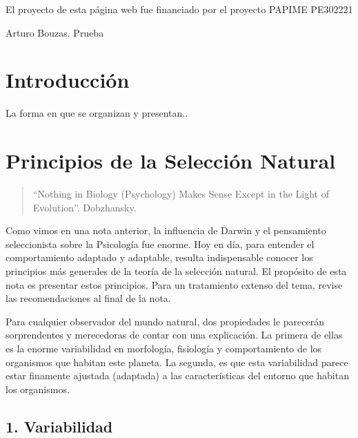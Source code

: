 \documentclass[
  letterpaper,
]{book}
\begin{document}
El proyecto de esta página web fue financiado por el proyecto PAPIME
PE302221

Arturo Bouzas. Prueba


\chapter*{Introducción}\label{introducciuxf3n}


La forma en que se organizan y presentan..


\chapter{Principios de la Selección
Natural}\label{principios-de-la-selecciuxf3n-natural}

\begin{quote}
``Nothing in Biology (Psychology) Makes Sense Except in the Light of
Evolution''. Dobzhansky.
\end{quote}

Como vimos en una nota anterior, la influencia de Darwin y el
pensamiento seleccionista sobre la Psicología fue enorme. Hoy en día,
para entender el comportamiento adaptado y adaptable, resulta
indispensable conocer los principios más generales de la teoría de la
selección natural. El propósito de esta nota es presentar estos
principios. Para un tratamiento extenso del tema, revise las
recomendaciones al final de la nota.

Para cualquier observador del mundo natural, dos propiedades le
parecerán sorprendentes y merecedoras de contar con una explicación. La
primera de ellas es la enorme variabilidad en morfología, fisiología y
comportamiento de los organismos que habitan este planeta. La segunda,
es que esta variabilidad parece estar finamente ajustada (adaptada) a
las características del entorno que habitan los organismos.

\section{1. Variabilidad}\label{variabilidad}
\end{document}
